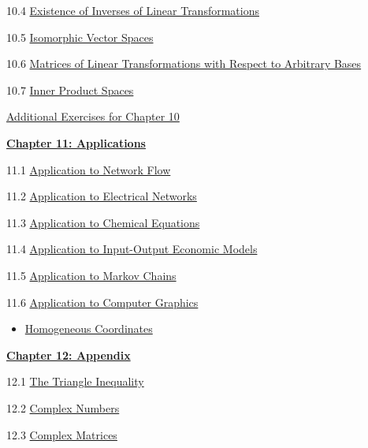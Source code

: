 \documentclass{ximera}
\begin{document}
10.4	\href{https://ximera.osu.edu/oerlinalg/LinearAlgebra/LTR-0025/main}{Existence of Inverses of Linear Transformations}
	
10.5	\href{https://ximera.osu.edu/oerlinalg/LinearAlgebra/LTR-0035/main}{Isomorphic Vector Spaces}
	
10.6	\href{https://ximera.osu.edu/oerlinalg/LinearAlgebra/LTR-0060/main}{Matrices of Linear Transformations with Respect to Arbitrary Bases}
	
10.7	\href{https://ximera.osu.edu/oerlinalg/LinearAlgebra/LTR-0080/main}{Inner Product Spaces}
	
\href{https://ximera.osu.edu/oerlinalg/LinearAlgebra/SUPX-0100/main}{Additional Exercises for Chapter 10}
	
\href{https://ximera.osu.edu/oerlinalg/LinearAlgebra/XLAChapter_applications/main}{\textbf{Chapter 11: Applications}}
	
11.1	\href{https://ximera.osu.edu/oerlinalg/LinearAlgebra/APP-0010/main}{Application to Network Flow}
	
11.2	\href{https://ximera.osu.edu/oerlinalg/LinearAlgebra/APP-0020/main}{Application to Electrical Networks}
	
11.3	\href{https://ximera.osu.edu/oerlinalg/LinearAlgebra/APP-0030/main}{Application to Chemical Equations}
	
11.4	\href{https://ximera.osu.edu/oerlinalg/LinearAlgebra/APP-0050/main}{Application to Input-Output Economic Models}
	
11.5	\href{https://ximera.osu.edu/oerlinalg/LinearAlgebra/APP-0060/main}{Application to Markov Chains}
	
11.6	\href{https://ximera.osu.edu/oerlinalg/LinearAlgebra/APP-0040/main}{Application to Computer Graphics}
\begin{itemize}
\item
\href{https://www.geogebra.org/m/yd5agbdg}{Homogeneous Coordinates}
\end{itemize}
	
\href{https://ximera.osu.edu/oerlinalg/LinearAlgebra/XLAChapter_appendix/main}{\textbf{Chapter 12: Appendix}}
	
12.1	\href{https://ximera.osu.edu/oerlinalg/LinearAlgebra/APX-0010/main}{The Triangle Inequality}
	
12.2	\href{https://ximera.osu.edu/oerlinalg/LinearAlgebra/APX-0020/main}{Complex Numbers}
	
12.3
\href{https://ximera.osu.edu/oerlinalg/LinearAlgebra/RTH-0050/main}{Complex Matrices}
\end{document}

